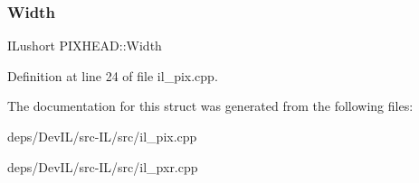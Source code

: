 \mbox{\label{structPIXHEAD_a189fcc3decfd8f0c8f287dc2ac146aba}} 
\subsubsection{\texorpdfstring{Width}{Width}}
{\footnotesize\ttfamily I\+Lushort P\+I\+X\+H\+E\+A\+D\+::\+Width}



Definition at line 24 of file il\+\_\+pix.\+cpp.



The documentation for this struct was generated from the following files\+:\begin{DoxyCompactItemize}
\item 
deps/\+Dev\+I\+L/src-\/\+I\+L/src/il\+\_\+pix.\+cpp\item 
deps/\+Dev\+I\+L/src-\/\+I\+L/src/il\+\_\+pxr.\+cpp\end{DoxyCompactItemize}

